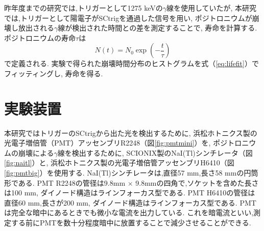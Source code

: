 昨年度までの研究では,トリガーとして1275 keVの$\gamma$線を使用していたが,
本研究では,トリガーとして陽電子がSCtrigを通過した信号を用い,
ポジトロニウムが崩壊し放出される$\gamma$線が検出された時間との差を測定することで,
寿命を計算する.
ポジトロニウムの寿命$\tau$は
\begin{equation}
N(t) = N_{0} \exp( - \frac{t}{\tau})
\label{eq:lifefit}
\end{equation}
で定義される.
実験で得られた崩壊時間分布のヒストグラムを式（\ref{eq:lifefit}）でフィッティングし,
寿命を得る.


\section{実験装置}

本研究ではトリガーのSCtrigから出た光を検出するために,
浜松ホトニクス製の光電子増倍管（PMT）アッセンブリR2248（図\ref{fig:pmtmini}）を,
ポジトロニウムの崩壊による$\gamma$線を検出するために,
SCIONIX製のNaI(Tl)シンチレータ（図\ref{fig:naitl}）と,
浜松ホトニクス製の光電子増倍管アッセンブリH6410（図\ref{fig:pmtbig}）を使用する.
NaI(Tl)シンチレータは,直径57 mm,長さ58 mmの円筒形である.
PMT R2248の管径は9.8mm $\times$ 9.8mmの四角で,ソケットを含めた長さは100 mm,
ダイノード構造はラインフォーカス型である.
PMT H6410の管径は直径60 mm,長さが200 mm,
ダイノード構造はラインフォーカス型である.
PMTは完全な暗中にあるときでも微小な電流を出力している.
これを暗電流といい,測定する前にPMTを数十分程度暗中に放置することで減少させることができる.

